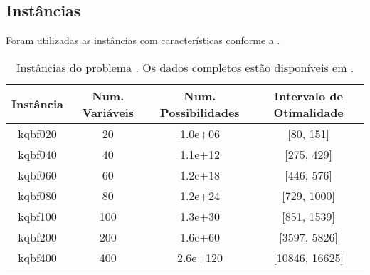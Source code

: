 \subsection{Instâncias}
\label{appendix:instances}

Foram utilizadas as instâncias com características conforme a .

\begin{table}[H]
    \centering
    \begin{tabular}{|c|c|c|c|}
        \hline
        Instância & Num. Variáveis & Num. Possibilidades & Intervalo de Otimalidade \\\hline
        kqbf020 &  20 &  1.0e+06 & [80, 151] \\\hline
        kqbf040 &  40 &  1.1e+12 & [275, 429] \\\hline
        kqbf060 &  60 &  1.2e+18 & [446, 576] \\\hline
        kqbf080 &  80 &  1.2e+24 & [729, 1000] \\\hline
        kqbf100 & 100 &  1.3e+30 & [851, 1539] \\\hline
        kqbf200 & 200 &  1.6e+60 & [3597, 5826] \\\hline
        kqbf400 & 400 & 2.6e+120 & [10846, 16625] \\\hline
    \end{tabular}
    \caption{Instâncias do problema \maxkqbf. Os dados completos estão disponíveis em \cite{bib:github}.}
    \label{table:tab-instances}
\end{table}
